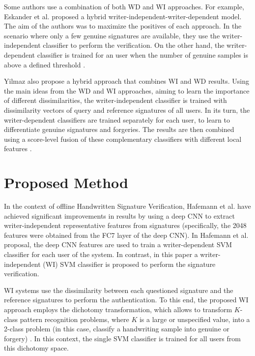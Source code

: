\documentclass[conference]{IEEEtran}
\begin{document}
Some authors use a combination of both WD and WI approaches. For
example, Eskander et al. \cite{eskander:13} proposed a hybrid writer-independent-writer-dependent model. The aim of the authors was to maximize the positives of each approach. In the scenario where only a few genuine signatures are available, they use the writer-independent classifier to perform the verification. On the other hand, the writer-dependent classifier is trained for an user when the number of genuine samples is above a defined threshold \cite{eskander:13}.


Yilmaz \cite{yilmaz:16} also propose a hybrid approach that combines WI and WD results. Using the main ideas from the WD and WI approaches, aiming to learn the importance of different dissimilarities, the writer-independent classifier is trained with dissimilarity vectors of query and reference signatures of all users. In its turn, the writer-dependent classifiers are trained separately for each user, to learn to differentiate genuine signatures and forgeries. The results are then combined using a score-level fusion of these complementary classifiers with different local features \cite{yilmaz:16}.


\section{Proposed Method}
\label{sec:proposed_method}


In the context of offline Handwritten Signature Verification, Hafemann et al. \cite{hafemann:17} have achieved significant improvements in results by using a deep CNN to extract writer-independent representative features from signatures (specifically, the 2048 features were obtained from the FC7 layer of the deep CNN). In  Hafemann et al. proposal, the deep CNN features are  used to train a writer-dependent SVM classifier for each user of the system. In contrast, in this paper a writer-independent (WI) SVM classifier is proposed to perform the signature verification.


WI systems use the dissimilarity between each questioned signature and the reference signatures to perform the authentication. To this end, the proposed WI approach employs the dichotomy transformation, which allows to transform $K$-class pattern recognition problems, where $K$ is a large or unspecified value, into a 2-class problem (in this case, classify a handwriting sample into genuine or forgery) \cite{rivard:13}. In this context, the single SVM classifier is trained for all users from this dichotomy space.
\end{document}
